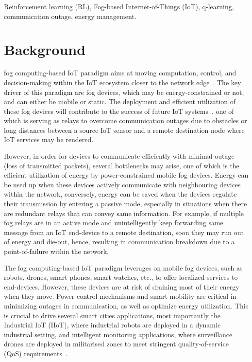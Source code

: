 \documentclass[journal]{IEEEtran}
\begin{document}
\begin{IEEEkeywords}
Reinforcement learning (RL), Fog-based Internet-of-Things (IoT), q-learning, communication outage, energy management.
\end{IEEEkeywords}


%
\IEEEpeerreviewmaketitle

\section{Background}
 fog computing-based IoT paradigm aims at moving computation, control, and decision-making within the IoT ecosystem closer to the network edge~\cite{Omoniwa2018}. The key driver of this paradigm are fog devices, which may be energy-constrained or not, and can either be mobile or static. The deployment and efficient utilization of these fog devices will contribute to the success of future IoT systems~\cite{Chiangh2016}, one of which is serving as relays to overcome communication outages due to obstacles or long distances between a source IoT sensor and a remote destination node where IoT services may be rendered.

However, in order for devices to communicate efficiently with minimal outage (loss of transmitted packets), several bottlenecks may arise, one of which is the efficient utilization of energy by power-constrained mobile fog devices. Energy can be used up when these devices actively communicate with neighbouring devices within the network, conversely, energy can be saved when the devices regulate their transmission by entering a passive mode, especially in situations when there are redundant relays that can convey same information. For example, if multiple fog relays are in an active mode and unintelligently keep forwarding same message from an IoT end-device to a remote destination, soon they may run out of energy and die-out, hence, resulting in communication breakdown due to a point-of-failure within the network. 

The fog computing-based IoT paradigm leverages on mobile fog devices, such as robots, drones, smart phones, smart watches, etc., to offer localized services to end-devices. However, these devices are at risk of draining most of their energy when they move. Power-control mechanisms and smart mobility are critical in minimizing outages in communication, as well as optimize energy utilization. This is crucial to drive several smart cities applications, most importantly the Industrial IoT (IIoT), where industrial robots are deployed in a dynamic industrial setting, and intelligent monitoring applications, where surveillance drones are deployed in militarised zones to meet stringent quality-of-service (QoS) requirements~\cite{OmoniwaRelay2018}.
\end{document}
